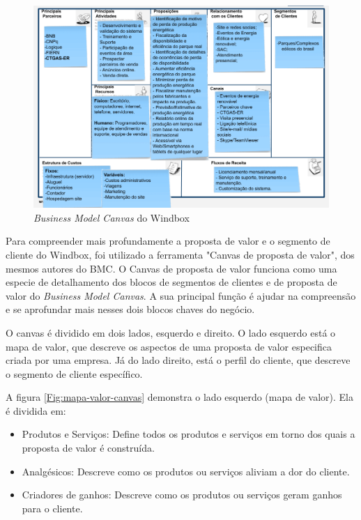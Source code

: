 \begin{figure}[htbp!] \begin{center}
\includegraphics[width=1\linewidth]{./figuras/BMG}
\caption{\textit{Business Model Canvas} do Windbox}
\label{Fig:bmc-windbox}
\end{center} 
\end{figure}

Para compreender mais profundamente a proposta de valor e o segmento de cliente do Windbox, foi utilizado a ferramenta "Canvas de proposta de valor", dos mesmos autores do BMC. O Canvas de proposta de valor funciona como uma especie de detalhamento dos blocos de segmentos de clientes e de proposta de valor do \textit{Business Model Canvas}. A sua principal função é ajudar na compreensão e se aprofundar mais nesses dois blocos chaves do negócio.

O canvas é dividido em dois lados, esquerdo e direito. O lado esquerdo está o mapa de valor, que descreve os aspectos de uma proposta de valor especifica criada por uma empresa. Já do lado direito, está o perfil do cliente, que descreve o segmento de cliente específico.

A figura \ref{Fig:mapa-valor-canvas} demonstra o lado esquerdo (mapa de valor). Ela é dividida em:
\begin{itemize}
    \item Produtos e Serviços: Define todos os produtos e serviços em torno dos quais a proposta de valor é construída.
    \item Analgésicos: Descreve como os produtos ou serviços aliviam a dor do cliente.
    \item Criadores de ganhos: Descreve como os produtos ou serviços geram ganhos para o cliente.
\end{itemize}

